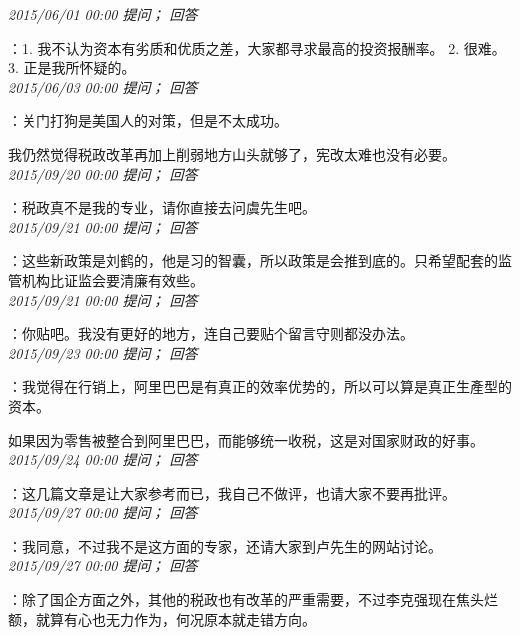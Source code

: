 \documentclass[twocolumn]{ctexart}
\begin{document}
\textit{\hfill\noindent\small 2015/06/01 00:00 提问； 回答}

：1. 我不认为资本有劣质和优质之差，大家都寻求最高的投资报酬率。
2. 很难。
3. 正是我所怀疑的。\\

\textit{\hfill\noindent\small 2015/06/03 00:00 提问； 回答}

：关门打狗是美国人的对策，但是不太成功。

我仍然觉得税政改革再加上削弱地方山头就够了，宪改太难也没有必要。\\

\textit{\hfill\noindent\small 2015/09/20 00:00 提问； 回答}

：税政真不是我的专业，请你直接去问虞先生吧。\\

\textit{\hfill\noindent\small 2015/09/21 00:00 提问； 回答}

：这些新政策是刘鹤的，他是习的智囊，所以政策是会推到底的。只希望配套的监管机构比证监会要清廉有效些。\\

\textit{\hfill\noindent\small 2015/09/21 00:00 提问； 回答}

：你贴吧。我没有更好的地方，连自己要贴个留言守则都没办法。\\

\textit{\hfill\noindent\small 2015/09/23 00:00 提问； 回答}

：我觉得在行销上，阿里巴巴是有真正的效率优势的，所以可以算是真正生產型的资本。

如果因为零售被整合到阿里巴巴，而能够统一收税，这是对国家财政的好事。\\

\textit{\hfill\noindent\small 2015/09/24 00:00 提问； 回答}

：这几篇文章是让大家参考而已，我自己不做评，也请大家不要再批评。\\

\textit{\hfill\noindent\small 2015/09/27 00:00 提问； 回答}

：我同意，不过我不是这方面的专家，还请大家到卢先生的网站讨论。\\

\textit{\hfill\noindent\small 2015/09/27 00:00 提问； 回答}

：除了国企方面之外，其他的税政也有改革的严重需要，不过李克强现在焦头烂额，就算有心也无力作为，何况原本就走错方向。\\
\end{document}
